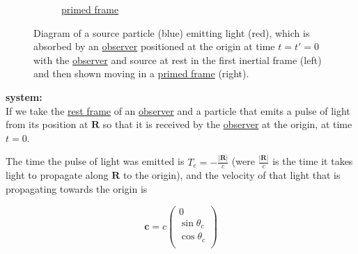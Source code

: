 \begin{figure}[ht]
\begin{subfigure}[b]{.49\textwidth}
		\caption{\hyperlink{def-Primed-Frame}{primed frame}}
	\end{subfigure}
	\caption{Diagram of a source particle (blue) emitting light (red), which is absorbed by an \protect\hyperlink{def-observer}{observer} positioned at the origin at time $t=t'=0$ with the \protect\hyperlink{def-observer}{observer} and source at rest in the first inertial frame (left) and then shown moving in a \protect\hyperlink{def-Primed-Frame}{primed frame} (right).}
	\label{fig: Retarded field}
\end{figure}

\noindent
\textbf{system:} \\
If we take the \hyperlink{def-proper-frame}{rest frame} of an \hyperlink{def-observer}{observer} and a particle that emits a pulse of light from its position at $\mathbf{R}$ so that it is received by the \hyperlink{def-observer}{observer} at the origin, at time $t=0$.

The time the pulse of light was emitted is $T_{e}= -\frac{|\mathbf{R}|}{c}$ (were $\frac{|\mathbf{R}|}{c}$ is the time it takes light to propagate along $\mathbf{R}$ to the origin), and the velocity of that light that is propagating towards the origin is

\begin{equation}
	\mathbf{c} = c
	\begin{pmatrix}
		0              \\
		\sin{\theta_c} \\
		\cos{\theta_c} \\
	\end{pmatrix}
\end{equation}

